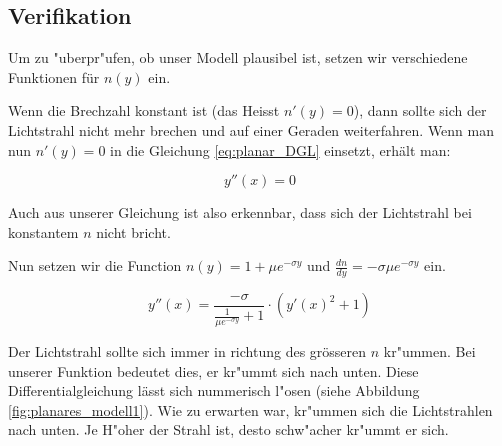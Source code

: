 \subsection{Verifikation}
Um zu "uberpr"ufen, ob unser Modell plausibel ist, setzen wir verschiedene Funktionen für $n(y)$ ein. 

Wenn die Brechzahl konstant ist (das Heisst $n'(y) = 0$), dann sollte sich der Lichtstrahl nicht mehr brechen und auf einer Geraden weiterfahren. 
Wenn man nun $n'(y)=0$ in die Gleichung \ref{eq:planar_DGL} einsetzt, erhält man: 

$$y''(x) = 0$$

Auch aus unserer Gleichung ist also erkennbar, dass sich der Lichtstrahl bei konstantem $n$ nicht bricht.

Nun setzen wir die Function $n(y) = 1 + \mu e^{-\sigma y}$ und $\frac{dn}{dy} = -\sigma \mu e^{-\sigma y}$ ein.

\begin{equation} \label{eq:planar_DGL_n}
y''(x) = \frac{-\sigma}{\frac{1}{\mu e^{-\sigma y}} + 1} \cdot \left( y'(x)^2 + 1 \right)
\end{equation}

Der Lichtstrahl sollte sich immer in richtung des grösseren $n$ kr"ummen. 
Bei unserer Funktion bedeutet dies, er kr"ummt sich nach unten. 
Diese Differentialgleichung lässt sich nummerisch l"osen (siehe Abbildung \ref{fig:planares_modell1}).
Wie zu erwarten war, kr"ummen sich die Lichtstrahlen nach unten.
Je H"oher der Strahl ist, desto schw"acher kr"ummt er sich. 

